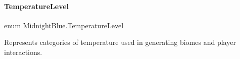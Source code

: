 \hypertarget{namespace_midnight_blue_a6ea6484178cbe707f25d1a0ed56db7ab}{}\label{namespace_midnight_blue_a6ea6484178cbe707f25d1a0ed56db7ab} 
\paragraph{\texorpdfstring{Temperature\+Level}{TemperatureLevel}}
{\footnotesize\ttfamily enum \hyperlink{namespace_midnight_blue_a6ea6484178cbe707f25d1a0ed56db7ab}{Midnight\+Blue.\+Temperature\+Level}\hspace{0.3cm}{\ttfamily [strong]}}



Represents categories of temperature used in generating biomes and player interactions. 

